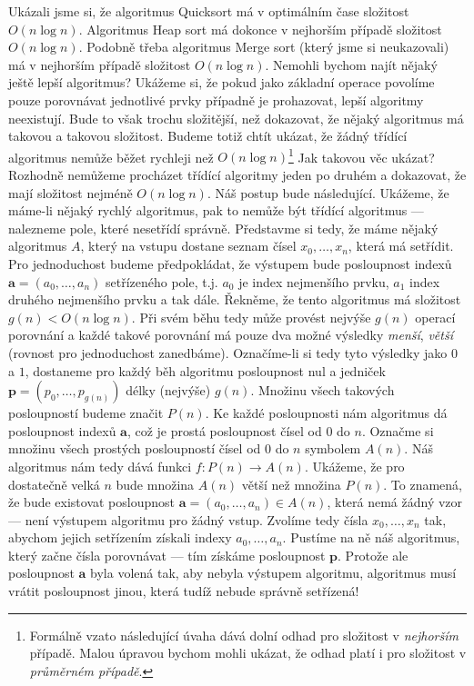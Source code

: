 Ukázali jsme si, že algoritmus Quicksort má v optimálním čase složitost $O(n\log n)$. Algoritmus Heap sort má dokonce v nejhorším případě složitost $O(n\log n)$.
Podobně třeba algoritmus Merge sort (který jsme si neukazovali) má v nejhorším případě složitost $O(n\log n)$. Nemohli bychom najít nějaký ještě lepší algoritmus?
Ukážeme si, že pokud jako základní operace povolíme pouze porovnávat jednotlivé prvky případně je prohazovat, lepší algoritmy neexistují. Bude to však trochu složitější, než dokazovat, že nějaký algoritmus má takovou a takovou
složitost. Budeme totiž chtít ukázat, že žádný třídící algoritmus nemůže běžet rychleji než $O(n\log n)$\footnote{Formálně vzato následující úvaha dává dolní odhad pro složitost v \emph{nejhorším} případě. Malou úpravou bychom mohli ukázat, že odhad platí i pro složitost v \emph{průměrném případě}.} Jak takovou věc ukázat? Rozhodně nemůžeme procházet
třídící algoritmy jeden po druhém a dokazovat, že mají složitost nejméně $O(n\log n)$. Náš postup bude následující. Ukážeme, že máme-li nějaký rychlý algoritmus,
pak to nemůže být třídící algoritmus --- nalezneme pole, které nesetřídí správně. Představme si tedy, že máme nějaký algoritmus $A$, který na vstupu dostane
seznam čísel $x_0,\ldots,x_n$, která má setřídit. Pro jednoduchost budeme předpokládat, že výstupem bude posloupnost indexů $\mathbf{a}=(a_0,\ldots,a_n)$ setřízeného pole, t.j.
$a_0$ je index nejmenšího prvku, $a_1$ index druhého nejmenšího prvku a tak dále. Řekněme, že tento algoritmus má složitost $g(n)<O(n\log n)$. Při svém běhu
tedy může provést nejvýše $g(n)$ operací porovnání a každé takové porovnání má pouze dva možné výsledky \emph{menší}, \emph{větší} (rovnost pro jednoduchost zanedbáme).
Označíme-li si tedy tyto výsledky jako $0$ a $1$, dostaneme pro každý běh algoritmu posloupnost nul a jedniček $\mathbf{p}=(p_0,\ldots,p_{g(n)})$ délky (nejvýše) $g(n)$.
Množinu všech takových posloupností budeme značit $P(n)$. Ke každé posloupnosti nám algoritmus dá posloupnost indexů $\mathbf{a}$, což je prostá posloupnost čísel od $0$ do $n$.
Označme si množinu všech prostých posloupností čísel od $0$ do $n$ symbolem $A(n)$. Náš algoritmus nám tedy dává funkci $f:P(n)\to A(n)$.
Ukážeme, že pro dostatečně velká $n$ bude množina $A(n)$ větší než množina $P(n)$. To znamená, že bude existovat posloupnost $\mathbf{a}=(a_0, \ldots, a_n)\in A(n)$,
která nemá žádný vzor --- není výstupem algoritmu pro žádný vstup. Zvolíme tedy čísla $x_0,\ldots, x_n$ tak,
abychom jejich setřízením získali indexy $a_0, \ldots, a_n$. Pustíme na ně náš algoritmus, který začne čísla porovnávat --- tím získáme posloupnost $\mathbf{p}$.
Protože ale posloupnost $\mathbf{a}$ byla volená tak, aby nebyla výstupem algoritmu, algoritmus musí vrátit posloupnost jinou, která tudíž nebude správně
setřízená!

